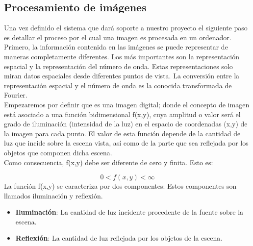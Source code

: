 \subsection{Procesamiento de imágenes}
Una vez definido el sistema que dará soporte a nuestro proyecto el siguiente paso es detallar el
proceso por el cual una imagen es procesada en un ordenador.\\
Primero, la información contenida en las imágenes se puede representar de maneras completamente diferentes.
Los más importantes son la representación espacial y la representación del número de onda. Estas representaciones solo
miran datos espaciales desde diferentes puntos de vista. La conversión entre la representación espacial y el número de
onda es la conocida transformada de Fourier.\cite{Book:Bernd1997} \\
Empezaremos por definir que es una imagen digital; donde el concepto de imagen está asociado a una función
bidimensional f(x,y), cuya amplitud o valor será el grado de iluminación (intensidad de la luz) en el espacio de
coordenadas (x,y) de la imagen para cada punto.\cite{Book:Arturo2011}
El valor de esta función depende de la
cantidad de luz que incide sobre la escena vista, así como de la parte que sea reflejada
por los objetos que componen dicha escena.\\
Como consecuencia, f(x,y) debe ser diferente de cero y finita. Esto es:

\begin{equation}
	0 < f(x,y) < \infty
\end{equation}
La función f(x,y) se caracteriza por dos componentes: Estos componentes son llamados
iluminación y reflexión.\cite{Book:Jose2005}
\begin{itemize}
	\item \textbf{Iluminación}: La cantidad de luz incidente procedente de la fuente sobre la
	escena.
	\item \textbf{Reflexión}: La cantidad de luz reflejada por los objetos de la escena.
\end{itemize}

